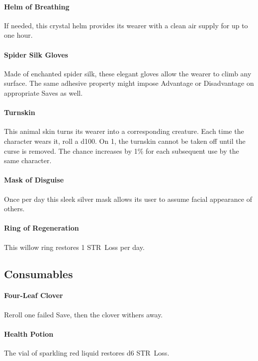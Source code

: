 \documentclass[itdr]{subfiles}
\begin{document}
\paragraph{Helm of Breathing}
If needed, this crystal helm provides its wearer with a clean air supply  for up to one hour.

\paragraph{Spider Silk Gloves}
Made of enchanted spider silk, these elegant gloves allow the wearer to climb any surface. The same adhesive property might impose Advantage or Disadvantage on appropriate Saves as well.

\paragraph{Turnskin}
This animal skin turns its wearer into a corresponding creature. Each time the character wears it, roll a d100. On 1, the turnskin cannot be taken off until the curse is removed. The chance increases by 1\% for each subsequent use by the same character.

\paragraph{Mask of Disguise}
Once per day this sleek silver mask allows its user to assume facial appearance of others.

\paragraph{Ring of Regeneration}
This willow ring restores 1 STR~Loss per day.



\subsection*{Consumables}

\paragraph{Four-Leaf Clover}
Reroll one failed Save, then the clover withers away.

\paragraph{Health Potion}
The vial of sparkling red liquid restores d6 STR~Loss.
\end{document}
